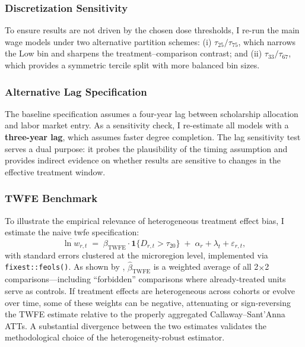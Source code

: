 \subsubsection{Discretization Sensitivity}
\label{sec:robustness_discretization}

To ensure results are not driven by the chosen dose thresholds, I re-run the main wage models under two alternative partition schemes: (i) $\tau_{25}/\tau_{75}$, which narrows the Low bin and sharpens the treatment--comparison contrast; and (ii) $\tau_{33}/\tau_{67}$, which provides a symmetric tercile split with more balanced bin sizes.


\subsubsection{Alternative Lag Specification}
\label{sec:robustness_lag}

The baseline specification assumes a four-year lag between scholarship allocation and labor market entry. As a sensitivity check, I re-estimate all models with a \textbf{three-year lag}, which assumes faster degree completion. The lag sensitivity test serves a dual purpose: it probes the plausibility of the timing assumption and provides indirect evidence on whether results are sensitive to changes in the effective treatment window.


\subsubsection{TWFE Benchmark}
\label{sec:robustness_twfe}

To illustrate the empirical relevance of heterogeneous treatment effect bias, I estimate the naive \acrshort{twfe} specification:
\begin{equation}
    \overline{\ln w}_{r,t}
    \;=\;
    \beta_{\text{TWFE}} \cdot \mathbf{1}\{D_{r,t} > \tau_{20}\}
    \;+\;
    \alpha_r + \lambda_t + \varepsilon_{r,t},
    \label{eq:twfe_benchmark}
\end{equation}
with standard errors clustered at the microregion level, implemented via \texttt{fixest::feols()}. As shown by , $\hat{\beta}_{\text{TWFE}}$ is a weighted average of all 2$\times$2 comparisons---including ``forbidden'' comparisons where already-treated units serve as controls. If treatment effects are heterogeneous across cohorts or evolve over time, some of these weights can be negative, attenuating or sign-reversing the TWFE estimate relative to the properly aggregated Callaway--Sant'Anna ATTs. A substantial divergence between the two estimates validates the methodological choice of the heterogeneity-robust estimator.


